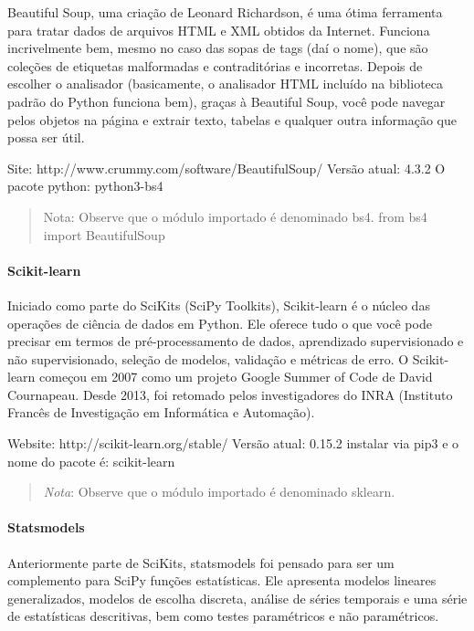 \documentclass[11pt]{article}
\begin{document}
Beautiful Soup, uma criação de Leonard Richardson, é uma ótima
ferramenta para tratar dados de arquivos HTML e XML obtidos da Internet.
Funciona incrivelmente bem, mesmo no caso das sopas de tags (daí o
nome), que são coleções de etiquetas malformadas e contraditórias e
incorretas. Depois de escolher o analisador (basicamente, o analisador
HTML incluído na biblioteca padrão do Python funciona bem), graças à
Beautiful Soup, você pode navegar pelos objetos na página e extrair
texto, tabelas e qualquer outra informação que possa ser útil.

Site: http://www.crummy.com/software/BeautifulSoup/ Versão atual: 4.3.2
O pacote python: python3-bs4

\begin{quote}
Nota: Observe que o módulo importado é denominado bs4. from bs4 import
BeautifulSoup
\end{quote}

\paragraph{Scikit-learn }\label{scikit-learn}

Iniciado como parte do SciKits (SciPy Toolkits), Scikit-learn é o núcleo
das operações de ciência de dados em Python. Ele oferece tudo o que você
pode precisar em termos de pré-processamento de dados, aprendizado
supervisionado e não supervisionado, seleção de modelos, validação e
métricas de erro. O Scikit-learn começou em 2007 como um projeto Google
Summer of Code de David Cournapeau. Desde 2013, foi retomado pelos
investigadores do INRA (Instituto Francês de Investigação em Informática
e Automação).

Website: http://scikit-learn.org/stable/ Versão atual: 0.15.2 instalar
via pip3 e o nome do pacote é: scikit-learn

\begin{quote}
\emph{Nota}: Observe que o módulo importado é denominado sklearn.
\end{quote}

\paragraph{Statsmodels }\label{statsmodels}

Anteriormente parte de SciKits, statsmodels foi pensado para ser um
complemento para SciPy funções estatísticas. Ele apresenta modelos
lineares generalizados, modelos de escolha discreta, análise de séries
temporais e uma série de estatísticas descritivas, bem como testes
paramétricos e não paramétricos.
\end{document}
